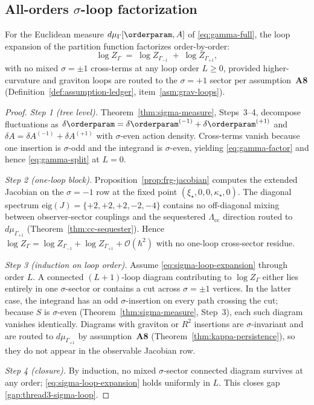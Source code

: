 \subsection{All-orders $\sigma$-loop factorization}

\begin{theorem}
\label{thm:thread3-sigma-loop}
For the Euclidean measure $d\mu_\Gamma[\orderparam,A]$ of \eqref{eq:gamma-full},
the loop expansion of the partition function factorizes order-by-order:
\begin{equation}\label{eq:sigma-loop-expansion}
  \log Z_\Gamma
  \;=\;
  \log Z_{\Gamma_{-1}}
  \;+\;
  \log Z_{\Gamma_{+1}},
\end{equation}
with no mixed $\sigma=\pm1$ cross-terms at any loop order $L\ge 0$, provided
higher-curvature and graviton loops are routed to the $\sigma=+1$ sector per
assumption~\textbf{A8} (Definition~\ref{def:assumption-ledger},
item~\ref{asm:grav-loops}).
\end{theorem}

\begin{proof}
\emph{Step 1 (tree level).}
Theorem~\ref{thm:sigma-measure}, Steps~3--4, decompose fluctuations as
$\delta\orderparam=\delta\orderparam^{(-1)}+\delta\orderparam^{(+1)}$ and
$\delta A=\delta A^{(-1)}+\delta A^{(+1)}$ with $\sigma$-even action density.
Cross-terms vanish because one insertion is $\sigma$-odd and the integrand is
$\sigma$-even, yielding \eqref{eq:gamma-factor} and hence \eqref{eq:gamma-split}
at $L=0$.

\emph{Step 2 (one-loop block).}
Proposition~\ref{prop:frg-jacobian} computes the extended Jacobian on the
$\sigma=-1$ row at the fixed point
$(\xi_\star,0,0,\kappa_\star,0)$. The diagonal spectrum
$\mathrm{eig}(J)=\{+2,+2,+2,-2,-4\}$ contains no off-diagonal mixing between
observer-sector couplings and the sequestered $\Lambda_{\mathrm{cc}}$ direction
routed to $d\mu_{\Gamma_{+1}}$ (Theorem~\ref{thm:cc-sequester}). Hence
$\log Z_\Gamma=\log Z_{\Gamma_{-1}}+\log Z_{\Gamma_{+1}}+\mathcal{O}(\hbar^2)$
with no one-loop cross-sector residue.

\emph{Step 3 (induction on loop order).}
Assume \eqref{eq:sigma-loop-expansion} through order $L$. A connected
$(L{+}1)$-loop diagram contributing to $\log Z_\Gamma$ either lies entirely
in one $\sigma$-sector or contains a cut across $\sigma=\pm1$ vertices. In the
latter case, the integrand has an odd $\sigma$-insertion on every path crossing
the cut; because $S$ is $\sigma$-even (Theorem~\ref{thm:sigma-measure},
Step~3), each such diagram vanishes identically. Diagrams with graviton or $R^2$
insertions are $\sigma$-invariant and are routed to $d\mu_{\Gamma_{+1}}$ by
assumption~\textbf{A8} (Theorem~\ref{thm:kappa-persistence}), so they do not
appear in the observable Jacobian row.

\emph{Step 4 (closure).}
By induction, no mixed $\sigma$-sector connected diagram survives at any
order; \eqref{eq:sigma-loop-expansion} holds uniformly in $L$. This closes gap
\ref{gap:thread3-sigma-loop}.
\end{proof}

